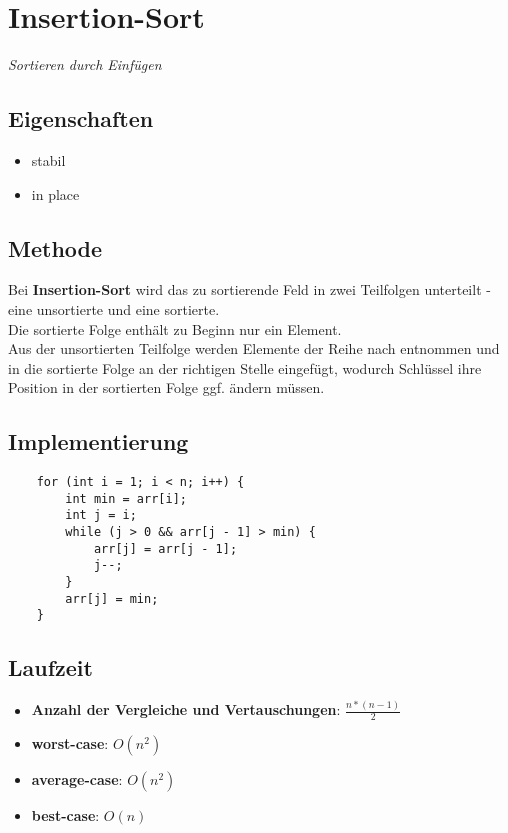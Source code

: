 \section{Insertion-Sort}

\textit{Sortieren durch Einfügen}

\subsection{Eigenschaften}
\begin{itemize}
    \item stabil
    \item in place
\end{itemize}

\subsection{Methode}
Bei \textbf{Insertion-Sort} wird das zu sortierende Feld in zwei Teilfolgen unterteilt - eine unsortierte und eine sortierte.\\
Die sortierte Folge enthält zu Beginn nur ein Element.\\
Aus der unsortierten Teilfolge werden Elemente der Reihe nach entnommen und in die sortierte Folge an der richtigen Stelle eingefügt, wodurch Schlüssel ihre Position in der sortierten Folge ggf. ändern müssen.


\subsection{Implementierung}
\begin{verbatim}
    for (int i = 1; i < n; i++) {
        int min = arr[i];
        int j = i;
        while (j > 0 && arr[j - 1] > min) {
            arr[j] = arr[j - 1];
            j--;
        }
        arr[j] = min;
    }
\end{verbatim}


\subsection{Laufzeit}
\begin{itemize}
    \item \textbf{Anzahl der Vergleiche und Vertauschungen}: $\frac{n * ( n - 1)}{2}$
    \item \textbf{worst-case}: $O(n^2)$
    \item \textbf{average-case}: $O(n^2)$
    \item \textbf{best-case}: $O(n)$
\end{itemize}